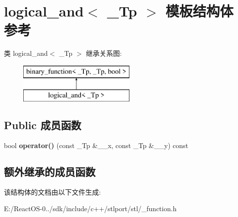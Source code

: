 \hypertarget{structlogical__and}{}\section{logical\+\_\+and$<$ \+\_\+\+Tp $>$ 模板结构体 参考}
\label{structlogical__and}
类 logical\+\_\+and$<$ \+\_\+\+Tp $>$ 继承关系图\+:\begin{figure}[H]
\begin{center}
\leavevmode
\includegraphics[height=2.000000cm]{structlogical__and}
\end{center}
\end{figure}
\subsection*{Public 成员函数}
\begin{DoxyCompactItemize}
\item 
\mbox{\label{structlogical__and_a186c084abf437520e8f1e347fd07882c}} 
bool {\bfseries operator()} (const \+\_\+\+Tp \&\+\_\+\+\_\+x, const \+\_\+\+Tp \&\+\_\+\+\_\+y) const
\end{DoxyCompactItemize}
\subsection*{额外继承的成员函数}


该结构体的文档由以下文件生成\+:\begin{DoxyCompactItemize}
\item 
E\+:/\+React\+O\+S-\/0../sdk/include/c++/stlport/stl/\+\_\+function.\+h\end{DoxyCompactItemize}
